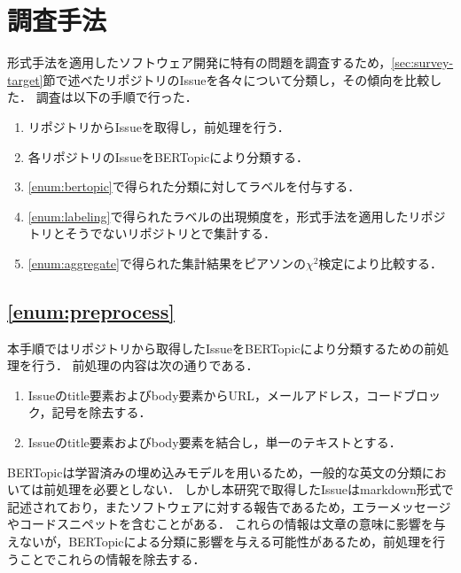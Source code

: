 \documentclass[main]{subfiles}
\begin{document}
\chapter{調査手法}


形式手法を適用したソフトウェア開発に特有の問題を調査するため，\ref{sec:survey-target}節で述べたリポジトリのIssueを各々について分類し，その傾向を比較した．
調査は以下の手順で行った．

\begin{enumerate}[label=手順\arabic*.]
	\item \label{enum:preprocess}
	      リポジトリからIssueを取得し，前処理を行う．
	\item \label{enum:bertopic}
	      各リポジトリのIssueをBERTopicにより分類する．
	\item \label{enum:labeling}
	      \ref{enum:bertopic}で得られた分類に対してラベルを付与する．
	\item \label{enum:aggregate}
	      \ref{enum:labeling}で得られたラベルの出現頻度を，形式手法を適用したリポジトリとそうでないリポジトリとで集計する．
	\item \label{enum:statistical}
	      \ref{enum:aggregate}で得られた集計結果をピアソンの\(\chi^2\)検定により比較する．
\end{enumerate}

\section{\ref{enum:preprocess}}

本手順ではリポジトリから取得したIssueをBERTopicにより分類するための前処理を行う．
前処理の内容は次の通りである．

\begin{enumerate}
	\item \label{enum:filter}
	      Issueのtitle要素およびbody要素からURL，メールアドレス，コードブロック，記号を除去する．
	\item \label{enum:lowercase}
	      Issueのtitle要素およびbody要素を結合し，単一のテキストとする．
\end{enumerate}

BERTopicは学習済みの埋め込みモデルを用いるため，一般的な英文の分類においては前処理を必要としない．
しかし本研究で取得したIssueはmarkdown形式で記述されており，またソフトウェアに対する報告であるため，エラーメッセージやコードスニペットを含むことがある．
これらの情報は文章の意味に影響を与えないが，BERTopicによる分類に影響を与える可能性があるため，前処理を行うことでこれらの情報を除去する．
\end{document}
